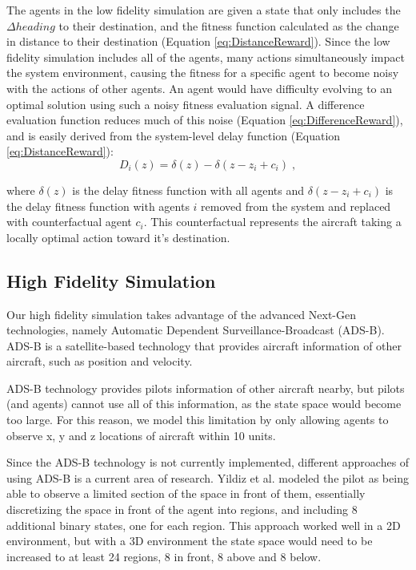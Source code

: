\documentclass{sig-alternate}
\begin{document}
The agents in the low fidelity simulation are given a state that only includes the $\Delta heading$ to their destination, and the fitness function calculated as the change in distance to their destination (Equation \ref{eq:DistanceReward}). Since the low fidelity simulation includes all of the agents, many actions simultaneously impact the system environment, causing the fitness for a specific agent to become noisy with the actions of other agents. An agent would have difficulty evolving to an optimal solution using such a noisy fitness evaluation signal. A difference evaluation function reduces much of this noise (Equation \ref{eq:DifferenceReward}), and is easily derived from the system-level delay function (Equation \ref{eq:DistanceReward}):
%
\begin{equation} \label{eq:DistanceReward-Difference}
D_i(z) = \delta(z) - \delta(z - z_i + c_i)\;,
\end{equation}

where $\delta(z)$ is the delay fitness function with all agents and $\delta(z - z_i + c_i)$ is the delay fitness function with agents $i$ removed from the system and replaced with counterfactual agent $c_i$. This counterfactual represents the aircraft taking a locally optimal action toward it's destination. 

\subsection{High Fidelity Simulation}

Our high fidelity simulation takes advantage of the advanced Next-Gen \cite{next-gen} technologies, namely Automatic Dependent Surveillance-Broadcast (ADS-B). ADS-B is a satellite-based technology that provides aircraft information of other aircraft, such as position and velocity. 

ADS-B technology provides pilots information of other aircraft nearby, but pilots (and agents) cannot use all of this information, as the state space would become too large. For this reason, we model this limitation by only allowing agents to observe x, y and z locations of aircraft within 10 units.

Since the ADS-B technology is not currently implemented, different approaches of using ADS-B is a current area of research. Yildiz et al. \cite{Adrian-next-gen} modeled the pilot as being able to observe a limited section of the space in front of them, essentially discretizing the space in front of the agent into regions, and including 8 additional binary states, one for each region. This approach worked well in a 2D environment, but with a 3D environment the state space would need to be increased to at least 24 regions, 8 in front, 8 above and 8 below. 
\end{document}
